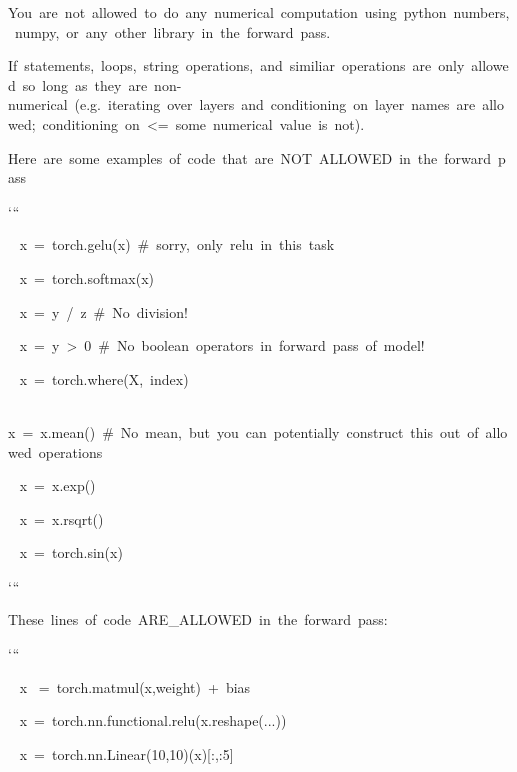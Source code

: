 \documentclass[
]{article}
\begin{document}
{You}{~}{are}{~}{not}{~}{allowed}{~}{to}{~}{do}{~}{any}{~}{numerical}{~}{computation}{~}{using}{~}{python}{~}{numbers,}{~}{numpy,}{~}{or}{~}{any}{~}{other}{~}{library}{~}{in}{~}{the}{~}{forward}{~}{pass.}

{}

{If}{~}{statements,}{~}{loops,}{~}{string}{~}{operations,}{~}{and}{~}{similiar}{~}{operations}{~}{are}{~}{only}{~}{allowed}{~}{so}{~}{long}{~}{as}{~}{they}{~}{are}{~}{non-numerical}{~}{(e.g.}{~}{iterating}{~}{over}{~}{layers}{~}{and}{~}{conditioning}{~}{on}{~}{layer}{~}{names}{~}{are}{~}{allowed;}{~}{conditioning}{~}{on}{~}{\textless=}{~}{some}{~}{numerical}{~}{value}{~}{is}{~}{not).}

{}

{Here}{~}{are}{~}{some}{~}{examples}{~}{of}{~}{code}{~}{that}{~}{are}{~}{NOT}{~}{ALLOWED}{~}{in}{~}{the}{~}{forward}{~}{pass}

{`\hspace{0pt}``}

{~
}{x}{~}{=}{~}{torch.gelu(x)}{~}{\#}{~}{sorry,}{~}{only}{~}{relu}{~}{in}{~}{this}{~}{task}

{~ }{x}{~}{=}{~}{torch.softmax(x)}

{~ }{x}{~}{=}{~}{y}{~}{/}{~}{z}{~}{\#}{~}{No}{~}{division!}

{~
}{x}{~}{=}{~}{y}{~}{\textgreater{}}{~}{0}{~}{\#}{~}{No}{~}{boolean}{~}{operators}{~}{in}{~}{forward}{~}{pass}{~}{of}{~}{model!}

{~ }{x}{~}{=}{~}{torch.where(X,}{~}{index)}

{~
}{x}{~}{=}{~}{x.mean()}{~}{\#}{~}{No}{~}{mean,}{~}{but}{~}{you}{~}{can}{~}{potentially}{~}{construct}{~}{this}{~}{out}{~}{of}{~}{allowed}{~}{operations}

{~ }{x}{~}{=}{~}{x.exp()}

{~ }{x}{~}{=}{~}{x.rsqrt()}

{~ }{x}{~}{=}{~}{torch.sin(x)}

{`\hspace{0pt}``}

{}

{These}{~}{lines}{~}{of}{~}{code}{~}{ARE\_ALLOWED}{~}{in}{~}{the}{~}{forward}{~}{pass:}

{`\hspace{0pt}``}

{~ }{x}{~ }{=}{~}{torch.matmul(x,weight)}{~}{+}{~}{bias}

{~ }{x}{~}{=}{~}{torch.nn.functional.relu(x.reshape(...))}

{~ }{x}{~}{=}{~}{torch.nn.Linear(10,10)(x){[}:,:5{]}}
\end{document}
